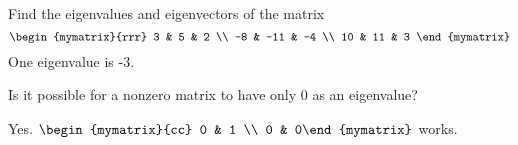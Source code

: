 \begin{enumialphparenastyle}
\begin{ex} Find the eigenvalues and eigenvectors of the matrix  
\begin{equation*}
\begin{mymatrix}{rrr}
3 & 5 & 2 \\
-8 & -11 & -4 \\
10 & 11 & 3
\end{mymatrix}
\end{equation*}
One eigenvalue is -3. 
\end{ex}

\begin{ex} Is it possible for a nonzero matrix to have only $0$ as an eigenvalue?
\vspace{1mm} 
\begin{sol}
Yes. $\begin{mymatrix}{cc}
0 & 1 \\
0 & 0%
\end{mymatrix} $ works.
\end{sol}
\end{ex}

\end{enumialphparenastyle}